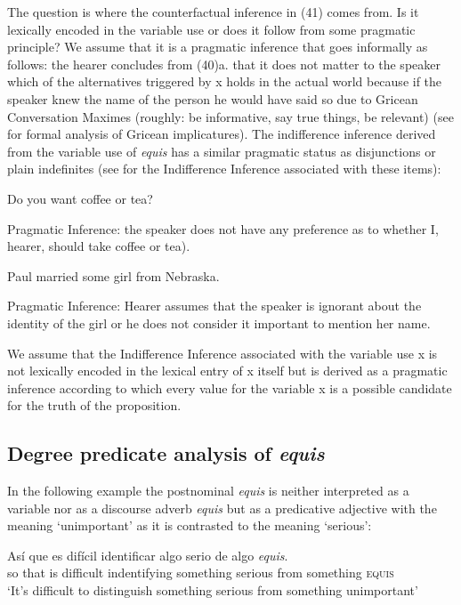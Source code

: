 \documentclass[output=paper
,modfonts
,nonflat]{langsci/langscibook}
\begin{document}
The question is where the counterfactual inference in (41) comes from. Is it lexically encoded in the variable use or does it follow from some pragmatic principle? We assume that it is a pragmatic inference that goes informally as follows: the hearer concludes from (40)a. that it does not matter to the speaker which of the alternatives triggered by x holds in the actual world because if the speaker knew the name of the person he would have said so due to Gricean Conversation Maximes (roughly: be informative, say true things, be relevant) (see \citealt{Aloni2005} for formal analysis of Gricean implicatures). The indifference inference derived from the variable use of \textit{equis} has a similar pragmatic status as disjunctions or plain indefinites (see \citealt{Aloni2005} for the Indifference Inference associated with these items):

\ea Do you want coffee or tea?
\par
Pragmatic Inference: the speaker does not have any preference as to whether I, hearer, should take coffee or tea).
\z

\ea Paul married some girl from Nebraska. 
\par
Pragmatic Inference: Hearer assumes that the speaker is ignorant about the 	identity of the girl or he does not consider it important to mention her name.
\z

We assume that the Indifference Inference associated with the variable use x is not lexically encoded in the lexical entry of x itself but is derived as a pragmatic inference according to which every value for the variable x is a possible candidate for the truth of the proposition.

\subsection{Degree predicate analysis of \textit{equis}}\label{sec:kellert:3.3}
In the following example the postnominal \textit{equis} is neither interpreted as a variable nor as a discourse adverb \textit{equis} but as a predicative adjective with the meaning ‘unimportant’ as it is contrasted to the meaning ‘serious’: 

\ea
\gll Así que es difícil identificar algo serio de algo \textit{equis}.\\
so that is difficult indentifying something serious from something	\textsc{equis}\\
\glt ‘It’s difficult to distinguish something serious from something unimportant’
\z
 
\end{document}
